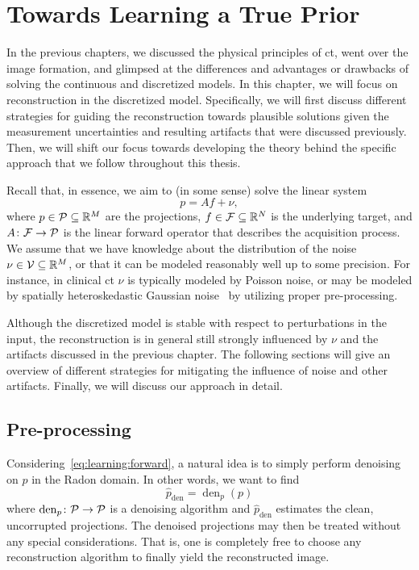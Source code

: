 \documentclass[../ml-ct.tex]{subfiles}
\begin{document}
\chapter{Towards Learning a True Prior}%
\label{chap:reconstruction}

\minitoc%
In the previous chapters, we discussed the physical principles of \gls{ct}, went over the image formation, and glimpsed at the differences and advantages or drawbacks of solving the continuous and discretized models.
In this chapter, we will focus on reconstruction in the discretized model.
Specifically, we will first discuss different strategies for guiding the reconstruction towards plausible solutions given the measurement uncertainties and resulting artifacts that were discussed previously.
Then, we will shift our focus towards developing the theory behind the specific approach that we follow throughout this thesis.

Recall that, in essence, we aim to (in some sense) solve the linear system
\begin{equation}
	p = Af + \nu,%
	\label{eq:learning:forward}
\end{equation}
where \( p \in \mathcal{P} \subseteq \mathbb{R}^M \) are the projections, \( f \in \mathcal{F} \subseteq \mathbb{R}^N \) is the underlying target, and \( A\colon\mathcal{F}\to\mathcal{P} \) is the linear forward operator that describes the acquisition process.
We assume that we have knowledge about the distribution of the noise \( \nu \in \mathcal{V} \subseteq \mathbb{R}^M \), or that it can be modeled reasonably well up to some precision.
For instance, in clinical \gls{ct} \( \nu \) is typically modeled by Poisson noise, or may be modeled by spatially heteroskedastic Gaussian noise~\cite{thibault_statistical_2007} by utilizing proper pre-processing.

Although the discretized model is stable with respect to perturbations in the input, the reconstruction is in general still strongly influenced by \( \nu \) and the artifacts discussed in the previous chapter.
The following sections will give an overview of different strategies for mitigating the influence of noise and other artifacts.
Finally, we will discuss our approach in detail.
\section{Pre-processing}
Considering~\eqref{eq:learning:forward}, a natural idea is to simply perform denoising on \( p \) in the Radon domain.
In other words, we want to find
\begin{equation}
	\hat{p}_\text{den} = \operatorname{den}_{p}(p)
\end{equation}
where \( \operatorname{den}_p\colon\mathcal{P}\to\mathcal{P} \) is a denoising algorithm and \( \hat{p}_\text{den} \) estimates the clean, uncorrupted projections.
The denoised projections may then be treated without any special considerations.
That is, one is completely free to choose any reconstruction algorithm to finally yield the reconstructed image.
\end{document}
